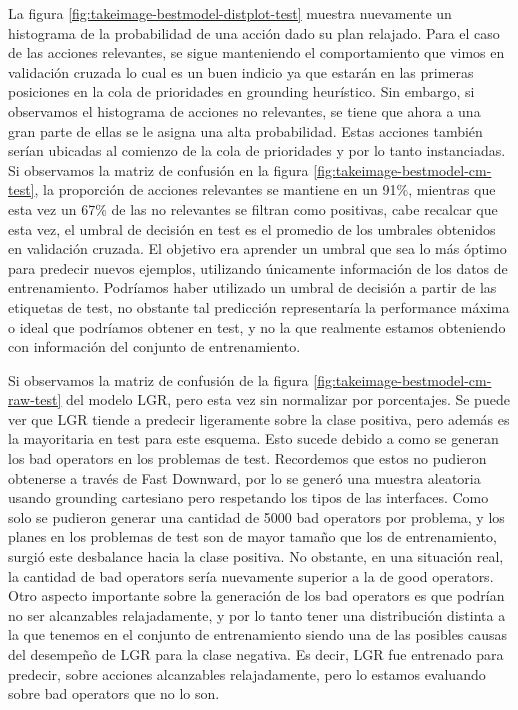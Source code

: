 La figura \ref{fig:takeimage-bestmodel-distplot-test} muestra nuevamente un
histograma de la probabilidad de una acción dado su plan relajado. Para el caso
de las acciones relevantes, se sigue manteniendo el comportamiento que vimos en
validación cruzada lo cual es un buen indicio ya que estarán en las primeras
posiciones en la cola de prioridades en grounding heurístico. Sin embargo, si
observamos el histograma de acciones no relevantes, se tiene que ahora a una
gran parte de ellas se le asigna una alta probabilidad. Estas acciones también
serían ubicadas al comienzo de la cola de prioridades y por lo tanto
instanciadas. Si observamos la matriz de confusión en la figura
\ref{fig:takeimage-bestmodel-cm-test}, la proporción de acciones relevantes se
mantiene en un 91\%, mientras que esta vez un 67\% de las no relevantes se
filtran como positivas, cabe recalcar que esta vez, el umbral de decisión en
test es el promedio de los umbrales obtenidos en validación cruzada. El objetivo
era aprender un umbral que sea lo más óptimo para predecir nuevos ejemplos,
utilizando únicamente información de los datos de entrenamiento. Podríamos haber
utilizado un umbral de decisión a partir de las etiquetas de test, no obstante
tal predicción representaría la performance máxima o ideal que podríamos obtener
en test, y no la que realmente estamos obteniendo con información del conjunto
de entrenamiento.

Si observamos la matriz de confusión de la figura
\ref{fig:takeimage-bestmodel-cm-raw-test} del modelo LGR, pero esta vez sin
normalizar por porcentajes. Se puede ver que LGR tiende a predecir ligeramente
sobre la clase positiva, pero además es la mayoritaria en test para este
esquema. Esto sucede debido a como se generan los bad operators en los problemas
de test. Recordemos que estos no pudieron obtenerse a través de Fast Downward,
por lo se generó una muestra aleatoria usando grounding cartesiano pero
respetando los tipos de las interfaces. Como solo se pudieron generar una
cantidad de 5000 bad operators por problema, y los planes en los problemas de
test son de mayor tamaño que los de entrenamiento, surgió este desbalance hacia
la clase positiva. No obstante, en una situación real, la cantidad de bad
operators sería nuevamente superior a la de good operators. Otro aspecto
importante sobre la generación de los bad operators es que podrían no ser
alcanzables relajadamente, y por lo tanto tener una distribución distinta a la
que tenemos en el conjunto de entrenamiento siendo una de las posibles causas
del desempeño de LGR para la clase negativa. Es decir, LGR fue entrenado para
predecir, sobre acciones alcanzables relajadamente, pero lo estamos evaluando
sobre bad operators que no lo son.

